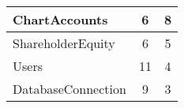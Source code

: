 \begin{table}[!h]
\begin{tabular}{|l|c|c|}
ChartAccounts                                                  & 6                                                                                              & 8                                                                                        \\ \hline
ShareholderEquity                                              & 6                                                                                              & 5                                                                                        \\ \hline
Users                                                          & 11                                                                                             & 4                                                                                        \\ \hline
DatabaseConnection                                             & 9                                                                                              & 3                                                                                        \\ \hline
\end{tabular}
\end{table}